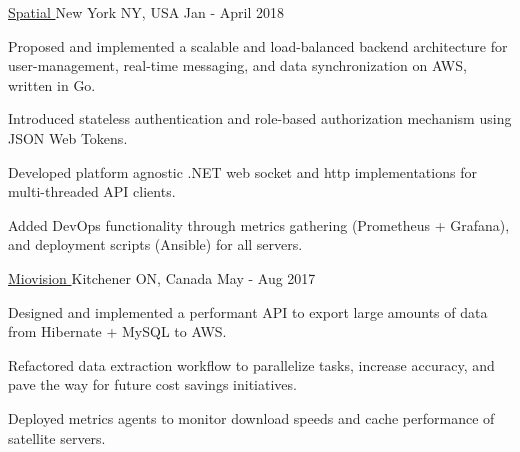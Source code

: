 \begin{cventries}
  {\href{https://spatial.is}{Spatial \faExternalLink}} {New York NY, USA} {Jan -
    April 2018} {
    \begin{cvitems}
    \item Proposed and implemented a scalable and load-balanced backend
      architecture for user-management, real-time messaging, and data
      synchronization on AWS, written in Go.
    \item Introduced stateless authentication and role-based authorization
      mechanism using JSON Web Tokens.
    \item Developed platform agnostic .NET web socket and http implementations
      for multi-threaded API clients. 
    \item Added DevOps functionality through metrics gathering (Prometheus +
      Grafana), and deployment scripts (Ansible) for all servers.
    \end{cvitems}
  }
    
  {\href{https://miovision.com}{Miovision \faExternalLink}} {Kitchener ON,
    Canada} {May - Aug 2017} {
    \begin{cvitems}
    \item Designed and implemented a performant API to export large amounts of data
      from Hibernate + MySQL to AWS.
    \item Refactored data extraction workflow to parallelize tasks, increase
      accuracy, and pave the way for future cost savings initiatives.
    \item Deployed metrics agents to monitor download speeds and cache
      performance of satellite servers. 
    \end{cvitems}
  }

\end{cventries}
